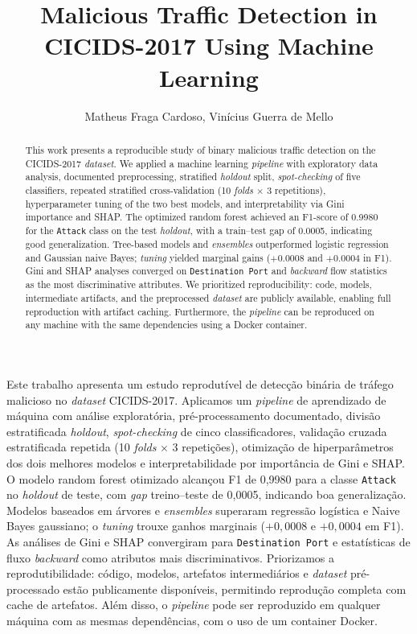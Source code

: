 \documentclass[12pt]{article}
\title{Malicious Traffic Detection in CICIDS-2017 Using Machine Learning}
\author{Matheus Fraga Cardoso, Vinícius Guerra de Mello}
\begin{document}
\raggedbottom

\maketitle
\pagestyle{plain}

\begin{abstract}
This work presents a reproducible study of binary malicious traffic detection on the CICIDS-2017 \textit{dataset}.
We applied a machine learning \textit{pipeline} with exploratory data analysis, documented preprocessing, stratified \textit{holdout} split, \textit{spot-checking} of five classifiers, repeated stratified cross-validation (10 \textit{folds} $\times$ 3 repetitions), hyperparameter tuning of the two best models, and interpretability via Gini importance and SHAP.
The optimized random forest achieved an F1-score of 0.9980 for the \texttt{Attack} class on the test \textit{holdout}, with a train--test gap of 0.0005, indicating good generalization.
Tree-based models and \textit{ensembles} outperformed logistic regression and Gaussian naive Bayes; \textit{tuning} yielded marginal gains ($+0.0008$ and $+0.0004$ in F1).
Gini and SHAP analyses converged on \texttt{Destination Port} and \textit{backward} flow statistics as the most discriminative attributes.
We prioritized reproducibility: code, models, intermediate artifacts, and the preprocessed \textit{dataset} are publicly available, enabling full reproduction with artifact caching.
Furthermore, the \textit{pipeline} can be reproduced on any machine with the same dependencies using a Docker container.
\end{abstract}

\begin{resumo}
Este trabalho apresenta um estudo reprodutível de detecção binária de tráfego malicioso no \textit{dataset} CICIDS-2017.
Aplicamos um \textit{pipeline} de aprendizado de máquina com análise exploratória, pré-processamento documentado, divisão estratificada \textit{holdout}, \textit{spot-checking} de cinco classificadores, validação cruzada estratificada repetida (10 \textit{folds} $\times$ 3 repetições), otimização de hiperparâmetros dos dois melhores modelos e interpretabilidade por importância de Gini e SHAP.
O modelo random forest otimizado alcançou F1 de 0,9980 para a classe \texttt{Attack} no \textit{holdout} de teste, com \textit{gap} treino--teste de 0,0005, indicando boa generalização.
Modelos baseados em árvores e \textit{ensembles} superaram regressão logística e Naive Bayes gaussiano; o \textit{tuning} trouxe ganhos marginais ($+0{,}0008$ e $+0{,}0004$ em F1).
As análises de Gini e SHAP convergiram para \texttt{Destination Port} e estatísticas de fluxo \textit{backward} como atributos mais discriminativos.
Priorizamos a reprodutibilidade: código, modelos, artefatos intermediários e \textit{dataset} pré-processado estão publicamente disponíveis, permitindo reprodução completa com cache de artefatos. Além disso, o \textit{pipeline} pode ser reproduzido em qualquer máquina com as mesmas dependências, com o uso de um container Docker.
\end{resumo}
\end{document}
